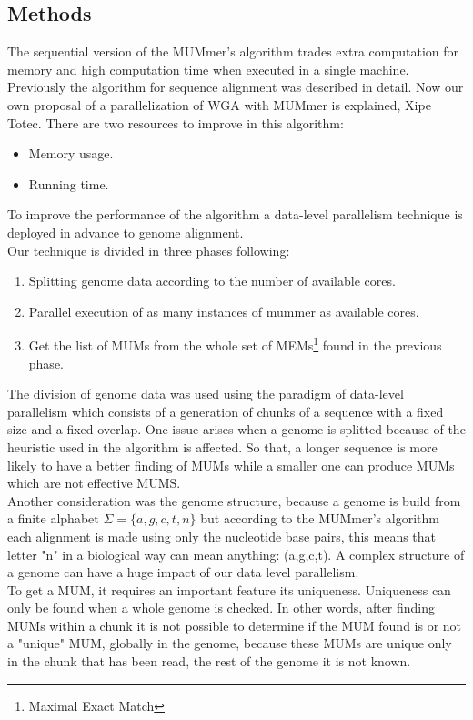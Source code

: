 \documentclass[10pt]{bmc_article}
\newenvironment{bmcformat}{\begin{raggedright}\baselineskip20pt\sloppy\setboolean{publ}{false}}{\end{raggedright}\baselineskip20pt\sloppy}
\begin{document}
\begin{bmcformat}
\section*{Methods}
The sequential version of the MUMmer's algorithm trades extra computation for memory and high computation time when executed in a single machine. \\
Previously the algorithm for sequence alignment was described in detail. Now our own proposal of a parallelization of WGA with MUMmer is explained, Xipe Totec. There are two resources to improve in this algorithm:
\begin{itemize}
\item Memory usage.
\item Running time.
\end{itemize}
To improve the performance of the algorithm a data-level parallelism technique is deployed in advance to genome alignment.\\
Our technique is divided in three phases following:
\begin{enumerate}
\item Splitting genome data according to the number of available cores.
\item Parallel execution of as many instances of mummer as available cores.
\item Get the list of MUMs from the whole set of MEMs\footnote{Maximal Exact Match} found in the previous phase.
\end{enumerate}
The division of genome data was used using the paradigm of data-level parallelism which consists of a generation of chunks of a sequence with a fixed size and a fixed overlap. One issue arises when a genome is splitted because of the heuristic used in the algorithm is affected. So that, a longer sequence is more likely to have a better finding of MUMs while a smaller one can produce MUMs which are not effective MUMS.\\
Another consideration was the genome structure, because a genome is build from a finite alphabet $\Sigma=\{a,g,c,t,n\}$ but according to the MUMmer's algorithm each alignment is made using only the nucleotide base pairs, this means that letter "n" in a biological way can mean anything: (a,g,c,t). A complex structure of a genome can have a huge impact of our data level parallelism.\\
To get a MUM, it requires an important feature its uniqueness. 
Uniqueness can only be found when a whole genome is checked.
In other words, after finding MUMs within a chunk it is not possible to determine if the MUM found is or not a "unique" MUM, globally in the genome,  because these MUMs are unique only in the chunk that has been read, the rest of the genome it is not known.\\

\end{bmcformat}
\end{document}
